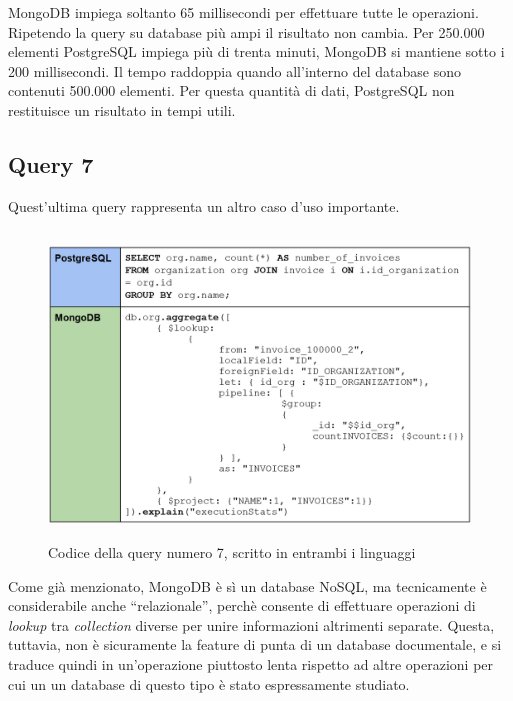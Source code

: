\noindent MongoDB impiega soltanto 65 millisecondi per effettuare tutte le operazioni.\\
Ripetendo la query su database più ampi il risultato non cambia. Per 250.000 elementi PostgreSQL impiega più di trenta minuti, MongoDB si mantiene sotto i 200 millisecondi. Il tempo raddoppia quando all'interno del database sono contenuti 500.000 elementi. Per questa quantità di dati, PostgreSQL non restituisce un risultato in tempi utili.\\


\subsection{Query 7}
Quest'ultima query rappresenta un altro caso d'uso importante.

\begin{figure}[htbp]
\begin{center}
\includegraphics[height=22em]{immagini/query/query7.png}
\caption{Codice della query numero 7, scritto in entrambi i linguaggi}
\end{center}
\end{figure}

\noindent Come già menzionato, MongoDB è sì un database NoSQL, ma tecnicamente è considerabile anche ``relazionale'', perchè consente di effettuare operazioni di \textit{lookup} tra \textit{collection} diverse per unire informazioni altrimenti separate. Questa, tuttavia, non è sicuramente la feature di punta di un database documentale, e si traduce quindi in un'operazione piuttosto lenta rispetto ad altre operazioni per cui un un database di questo tipo è stato espressamente studiato.\\

